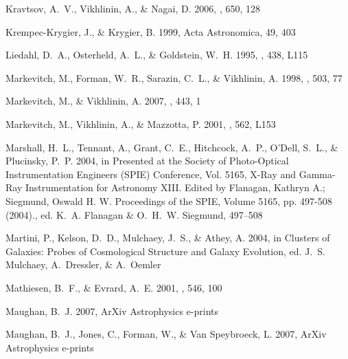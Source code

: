 \documentclass[12pt,preprint]{aastex}
\begin{document}
\begin{thebibliography}{83}
{Kravtsov}, A.~V., {Vikhlinin}, A., \& {Nagai}, D. 2006, \apj, 650, 128

{Krempec-Krygier}, J., \& {Krygier}, B. 1999, Acta Astronomica, 49, 403

{Liedahl}, D.~A., {Osterheld}, A.~L., \& {Goldstein}, W.~H. 1995, \apjl, 438,
  L115

{Markevitch}, M., {Forman}, W.~R., {Sarazin}, C.~L., \& {Vikhlinin}, A. 1998,
  \apj, 503, 77

{Markevitch}, M., \& {Vikhlinin}, A. 2007, \physrep, 443, 1

{Markevitch}, M., {Vikhlinin}, A., \& {Mazzotta}, P. 2001, \apjl, 562, L153

{Marshall}, H.~L., {Tennant}, A., {Grant}, C.~E., {Hitchcock}, A.~P., {O'Dell},
  S.~L., \& {Plucinsky}, P.~P. 2004, in Presented at the Society of
  Photo-Optical Instrumentation Engineers (SPIE) Conference, Vol. 5165, X-Ray
  and Gamma-Ray Instrumentation for Astronomy XIII. Edited by Flanagan, Kathryn
  A.; Siegmund, Oswald H. W. Proceedings of the SPIE, Volume 5165, pp. 497-508
  (2004)., ed. K.~A. {Flanagan} \& O.~H.~W. {Siegmund}, 497--508

{Martini}, P., {Kelson}, D.~D., {Mulchaey}, J.~S., \& {Athey}, A. 2004, in
  Clusters of Galaxies: Probes of Cosmological Structure and Galaxy Evolution,
  ed. J.~S. {Mulchaey}, A.~{Dressler}, \& A.~{Oemler}

{Mathiesen}, B.~F., \& {Evrard}, A.~E. 2001, \apj, 546, 100

{Maughan}, B.~J. 2007, ArXiv Astrophysics e-prints

{Maughan}, B.~J., {Jones}, C., {Forman}, W., \& {Van Speybroeck}, L. 2007,
  ArXiv Astrophysics e-prints


\end{thebibliography}
\end{document}
